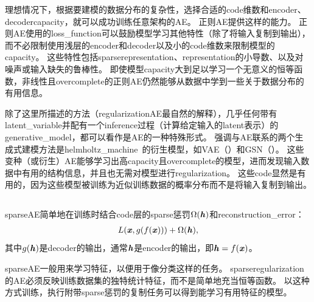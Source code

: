 理想情况下，根据要建模的数据分布的复杂性，选择合适的\gls{code}维数和\gls{encoder}、\gls{decoder}\gls{capacity}，就可以成功训练任意架构的\gls{AE}。
正则\gls{AE}提供这样的能力。
正则\gls{AE}使用的\gls{loss_function}可以鼓励模型学习其他特性（除了将输入复制到输出），而不必限制使用浅层的\gls{encoder}和\gls{decoder}以及小的\gls{code}维数来限制模型的\gls{capacity}。
这些特性包括\gls{sparse}\gls{representation}、\gls{representation}的小导数、以及对噪声或输入缺失的鲁棒性。
即使模型\gls{capacity}大到足以学习一个无意义的恒等函数，非线性且\gls{overcomplete}的正则\gls{AE}仍然能够从数据中学到一些关于数据分布的有用信息。


除了这里所描述的方法（\gls{regularization}\gls{AE}最自然的解释），几乎任何带有\gls{latent_variable}并配有一个\gls{inference}过程（计算给定输入的\gls{latent}表示）的\gls{generative_model}，都可以看作是\gls{AE}的一种特殊形式。
强调与\gls{AE}联系的两个生成式建模方法是\gls{helmholtz_machine}~\citep{Hinton95}的衍生模型，如\gls{VAE}（）和\gls{GSN}（）。
这些变种（或衍生）\gls{AE}能够学习出高\gls{capacity}且\gls{overcomplete}的模型，进而发现输入数据中有用的结构信息，并且也无需对模型进行\gls{regularization}。
这些\gls{code}显然是有用的，因为这些模型被训练为近似训练数据的概率分布而不是将输入复制到输出。 %


\subsection{}
\label{sec:sparse_autoencoders}
\gls{sparse}\gls{AE}简单地在训练时结合\gls{code}层的\gls{sparse}惩罚$\Omega(\boldsymbol{\mathit{h}})$和\gls{reconstruction_error}：
\begin{align}
    L(\boldsymbol{\mathit{x}}, g(f(\boldsymbol{\mathit{x}}))) + \Omega(\boldsymbol{\mathit{h}}),
\end{align}
其中$g(\boldsymbol{\mathit{h}})$是\gls{decoder}的输出，通常$\boldsymbol{\mathit{h}}$是\gls{encoder}的输出，即$\boldsymbol{\mathit{h}} = f(\boldsymbol{\mathit{x}})$。


\gls{sparse}\gls{AE}一般用来学习特征，以便用于像分类这样的任务。
\gls{sparse}\gls{regularization}的\gls{AE}必须反映训练数据集的独特统计特征，而不是简单地充当恒等函数。
以这种方式训练，执行附带\gls{sparse}惩罚的复制任务可以得到能学习有用特征的模型。


